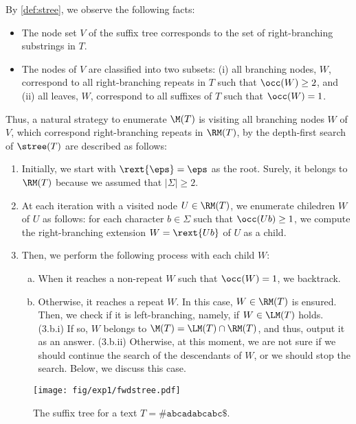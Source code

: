 By \cref{def:stree}, we observe the following facts: 
\begin{itemize}
\item The node set $V$ of the suffix tree corresponds to the set of right-branching substrings in $T$. 
  
\item The nodes of $V$ are classified into two subsets: (i) all branching nodes, $W$, correspond to all right-branching repeats in $T$ such that $\occ(W)\ge 2$, and (ii) all leaves, $W$, correspond to all suffixes of $T$ such that $\occ(W) = 1$. 
  
\end{itemize}


Thus, a natural strategy to enumerate $\M(T)$ is visiting all branching nodes $W$ of $V$, which correspond right-branching repeats in $\RM(T)$, by the depth-first search of $\stree(T)$ are described as follows:
\begin{enumerate}[(1)]
\item Initially, we start with $\rext{\eps} = \eps$ as the root. Surely, it belongs to $\RM(T)$ because we assumed that $|\Sigma|\ge 2$. 
\item At each iteration with a visited node $U\in \RM(T)$, we enumerate chiledren $W$ of $U$ as follows: for each character $b \in \Sigma$ such that $\occ(Ub) \ge 1$, we compute the right-branching extension $W = \rext{Ub}$ of $U$ as a child. 

\item Then, we perform the following process with each child $W$:
  \begin{enumerate}[(a)]
\item When it reaches a non-repeat $W$ such that $\occ(W) = 1$, we backtrack.
\item Otherwise, it reaches a repeat $W$. In this case, $W \in \RM(T)$ is ensured.
  Then, we check if it is left-branching, namely, if $W \in \LM(T)$ holds.
  (3.b.i) If so, $W$ belongs to $\M(T) = \LM(T)\cap \RM(T)$, and thus, output it as an answer.
  (3.b.ii) Otherwise, at this moment, we are not sure if we should continue the search of the descendants of $W$, or we should stop the search. Below, we discuss this case. 
  \end{enumerate}
\end{enumerate}

\begin{figure}[t]
\centering  
  \texttt{[image: fig/exp1/fwdstree.pdf]}
  \caption{The suffix tree for a text $T = \mathtt{\#abcadabcabc\$}$.}\label{fig:fwdstree}
\end{figure}

